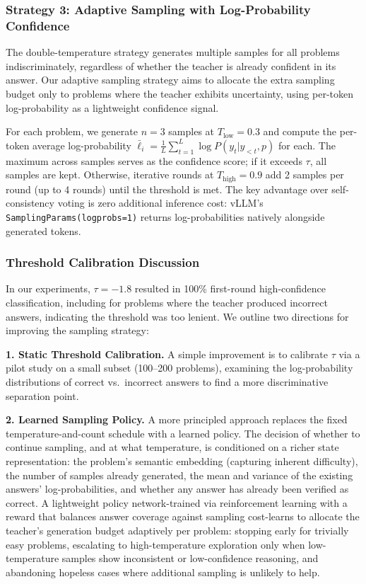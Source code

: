 \documentclass{article}
\begin{document}
\subsubsection{Strategy 3: Adaptive Sampling with Log-Probability Confidence}

The double-temperature strategy generates multiple samples for all problems indiscriminately, regardless of whether the teacher is already confident in its answer. Our adaptive sampling strategy aims to allocate the extra sampling budget only to problems where the teacher exhibits uncertainty, using per-token log-probability as a lightweight confidence signal.

For each problem, we generate $n = 3$ samples at $T_{\text{low}} = 0.3$ and compute the per-token average log-probability $\bar{\ell}_i = \frac{1}{L}\sum_{t=1}^{L} \log P(y_t|y_{<t}, p)$ for each. The maximum across samples serves as the confidence score; if it exceeds $\tau$, all samples are kept. Otherwise, iterative rounds at $T_{\text{high}} = 0.9$ add 2 samples per round (up to 4 rounds) until the threshold is met. The key advantage over self-consistency voting is zero additional inference cost: vLLM's \texttt{SamplingParams(logprobs=1)} returns log-probabilities natively alongside generated tokens.

\subsubsection{Threshold Calibration Discussion}

In our experiments, $\tau = -1.8$ resulted in 100\% first-round high-confidence classification, including for problems where the teacher produced incorrect answers, indicating the threshold was too lenient. We outline two directions for improving the sampling strategy:

\textbf{1. Static Threshold Calibration.} A simple improvement is to calibrate $\tau$ via a pilot study on a small subset (100--200 problems), examining the log-probability distributions of correct vs.\ incorrect answers to find a more discriminative separation point.

\textbf{2. Learned Sampling Policy.} A more principled approach replaces the fixed temperature-and-count schedule with a learned policy. The decision of whether to continue sampling, and at what temperature, is conditioned on a richer state representation: the problem's semantic embedding (capturing inherent difficulty), the number of samples already generated, the mean and variance of the existing answers' log-probabilities, and whether any answer has already been verified as correct. A lightweight policy network-trained via reinforcement learning with a reward that balances answer coverage against sampling cost-learns to allocate the teacher's generation budget adaptively per problem: stopping early for trivially easy problems, escalating to high-temperature exploration only when low-temperature samples show inconsistent or low-confidence reasoning, and abandoning hopeless cases where additional sampling is unlikely to help.
\end{document}
